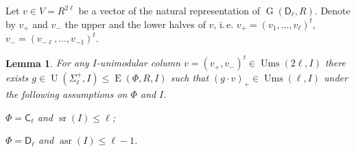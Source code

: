 \documentclass[11pt]{amsart}
\theoremstyle{plain}
\numberwithin{equation}{section}
\newtheorem{lemma}{Lemma}
\numberwithin{lemma}{section}
\theoremstyle{definition}
\theoremstyle{remark}
\DeclareMathOperator{\G}{G}
\DeclareMathOperator{\E}{E}
\DeclareMathOperator{\U}{U}
\DeclareMathOperator{\sr}{sr}
\DeclareMathOperator{\asr}{asr}
\DeclareMathOperator{\Ums}{Ums}
\newcommand{\rC}{\mathsf{C}}
\newcommand{\rD}{\mathsf{D}}
\begin{document}
Let $v\in V=R^{2\ell}$ be a vector of the natural representation of $\G(\rD_\ell, R)$.
Denote by $v_+$ and $v_-$ the upper and the lower halves of $v$, i.\,e. $v_+=(v_1, \ldots, v_\ell)^t$, $v_-=(v_{-\ell}, \ldots, v_{-1})^t$.
\begin{lemma}\label{lemma:asrUnip}
For any $I$-unimodular column $v=(v_+, v_-)^t\in\Ums(2\ell, I)$ there exists $g\in\U(\Sigma^+_\ell, I) \leq \E(\Phi, R, I)$ 
such that $(g \cdot v)_+ \in \Ums(\ell, I)$ under the following assumptions on $\Phi$ and $I$.
\begin{lemlist}
\item \label{item:asrUnipC} $\Phi=\rC_\ell$ and $\sr(I) \leqslant \ell$;
\item \label{item:asrUnipD} $\Phi=\rD_\ell$ and $\asr(I)\leqslant \ell -1$.
\end{lemlist}
\end{lemma}
\end{document}
